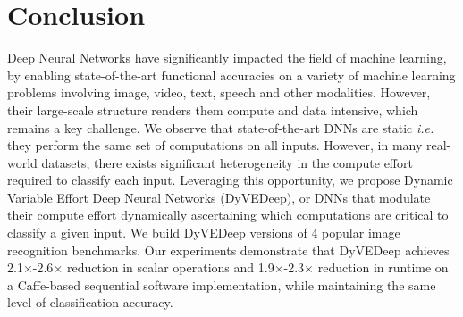 \documentclass{article} %
\begin{document}
\section{Conclusion}  \label{sec:conclusion}
Deep Neural Networks have significantly impacted the field of machine learning, by enabling state-of-the-art functional accuracies on a variety of machine learning problems involving image, video, text, speech and other modalities. However, their large-scale structure renders them compute and data intensive, which remains a key challenge. We observe that state-of-the-art DNNs are static \emph{i.e.} they perform the same set of computations on all inputs. However, in many real-world datasets, there exists significant heterogeneity in the compute effort required to classify each input. Leveraging this opportunity, we propose Dynamic Variable Effort Deep Neural Networks (DyVEDeep), or DNNs that modulate their compute effort dynamically ascertaining which computations are critical to classify a given input. We build DyVEDeep versions of 4 popular image recognition benchmarks. Our experiments demonstrate that DyVEDeep achieves 2.1$\times$-2.6$\times$ reduction in scalar operations and 1.9$\times$-2.3$\times$ reduction in runtime on a Caffe-based sequential software implementation, while maintaining the same level of classification accuracy.



\end{document}
